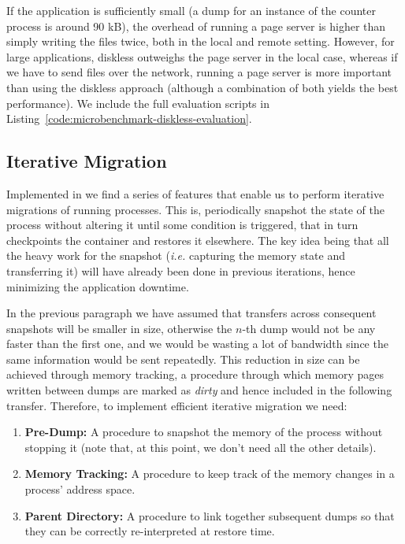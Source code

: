If the application is sufficiently small (a dump for an instance of the counter
process is around 90 kB), the overhead of running a page server is higher than
simply writing the files twice, both in the local and remote setting.
However, for large applications, diskless outweighs the page server in the
local case, whereas if we have to send files over the network, running a page
server is more important than using the diskless approach (although a
combination of both yields the best performance).
We include the full evaluation scripts in
Listing~\ref{code:microbenchmark-diskless-evaluation}.

\subsection{Iterative Migration}


Implemented in \criu we find a series of features that enable us to perform
iterative migrations of running processes.
This is, periodically snapshot the state of the process without altering it
until some condition is triggered, that in turn checkpoints the container and
restores it elsewhere.
The key idea being that all the heavy work for the snapshot (\textit{i.e.}
capturing the memory state and transferring it) will have already been done in
previous iterations, hence minimizing the application downtime.

In the previous paragraph we have assumed that transfers across consequent
snapshots will be smaller in size, otherwise the $n$-th dump would not be any
faster than the first one, and we would be wasting a lot of bandwidth since the
same information would be sent repeatedly.
This reduction in size can be achieved through memory tracking, a procedure
through which memory pages written between dumps are marked as \emph{dirty} and
hence included in the following transfer.
Therefore, to implement efficient iterative migration we need:
\begin{enumerate}
    \item \textbf{Pre-Dump:} A procedure to snapshot the memory
          of the process without stopping it (note that, at this point, we don't need all
          the other details).
    \item \textbf{Memory Tracking:}
          A procedure to keep track of the memory changes in a process' address space.
    \item \textbf{Parent Directory:}
          A procedure to link together subsequent dumps so that they can be correctly
          re-interpreted at restore time.
\end{enumerate}

